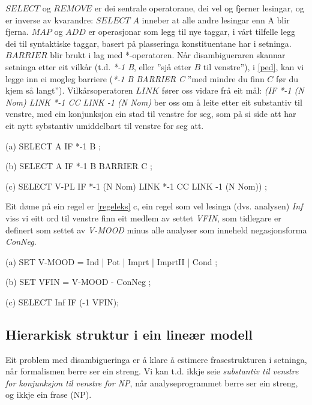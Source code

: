\documentclass[a4paper,norsk]{article}
\begin{document}
$SELECT$ og $REMOVE$ er dei sentrale operatorane, dei vel og fjerner lesingar, og er inverse av kvarandre: $SELECT$ $A$ inneber at alle andre lesingar enn A blir fjerna. $MAP$ og $ADD$ er operasjonar som legg til nye taggar, i vårt tilfelle legg dei til syntaktiske taggar, basert på plasseringa konstituentane har i setninga. $BARRIER$ blir brukt i lag med *-operatoren. Når disambigueraren skannar setninga etter eit vilkår (t.d. \textit{*-1 B}, eller ''sjå etter $B$ til venstre''), i \ref{ped}, kan vi legge inn ei mogleg barriere  (\textit{*-1 B BARRIER C} ''med mindre du finn $C$ før du kjem så langt''). Vilkårsoperatoren $LINK$ fører oss vidare frå eit mål: \textit{(IF *-1 (N Nom) LINK *-1 CC LINK -1 (N Nom)} ber oss om å leite etter eit substantiv til venstre, med ein konjunksjon ein stad til venstre for seg, som på si side att har eit nytt sybstantiv umiddelbart til venstre for seg att.%

\begin{example}\label{ped}
\item[(a)] SELECT A IF *-1 B ;
\item[(b)] SELECT A IF *-1 B BARRIER C ;
\item[(c)] SELECT V-PL IF *-1 (N Nom) LINK *-1 CC LINK -1 (N Nom)) ;
\end{example}

Eit døme på ein regel er \ref{regeleks} c, ein regel som vel lesinga (dvs. analysen) \emph{Inf} viss vi eitt ord til venstre finn eit medlem av settet \emph{VFIN}, som  tidlegare er definert som settet av \emph{V-MOOD} minus alle analyser som inneheld negasjonsforma \emph{ConNeg}.%

\begin{example}\label{regeleks}
\item[(a)] SET V-MOOD = Ind | Pot | Imprt | ImprtII | Cond ; 
\item[(b)] SET VFIN  =  V-MOOD - ConNeg ; 
\item[(c)] SELECT Inf IF (-1 VFIN); 
\end{example}%

\subsection{Hierarkisk struktur i ein lineær modell}

Eit problem med disambigueringa er å klare å estimere frasestrukturen i setninga, når formalismen berre ser ein streng. Vi kan t.d. ikkje seie \textit{substantiv til venstre for konjunksjon til venstre for NP}, når analyseprogrammet berre ser ein streng, og ikkje ein frase (NP). %
\end{document}
